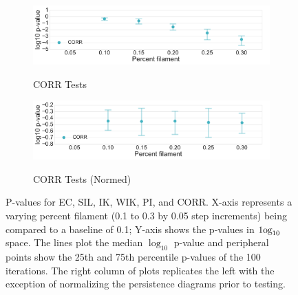\documentclass[12pt]{article}
\begin{document}
\begin{center}
\begin{figure}[htp!]
\begin{subfigure}{.45\textwidth}
      \label{fig:sub_weight_normed}
    \end{subfigure}
    \begin{subfigure}{.45\textwidth}
      \caption{CORR Tests}
      \includegraphics[width=\linewidth]{figure_8_correlation_group.pdf}
      \label{fig:sub_corr}
    \end{subfigure}
    \begin{subfigure}{.45\textwidth}
      \caption{CORR Tests (Normed)}
      \includegraphics[width=\linewidth]{figure_8_correlation_group_normed.pdf}
      \label{fig:sub_corr_normed}
    \end{subfigure}
  \caption{P-values for EC, SIL, IK, WIK, PI, and CORR. X-axis represents a varying percent filament (0.1 to 0.3 by 0.05 step increments) being compared to a baseline of 0.1; Y-axis shows the p-values in $\textup{1og}_{10}$ space. The lines plot the median $\log_{10}$ p-value and peripheral points show the 25th and 75th percentile p-values of the 100 iterations. The right column of plots replicates the left with the exception of normalizing the persistence diagrams prior to testing. }
  \label{fig:sub_unstandardized_results}
  \end{figure}
\end{center}
\end{document}
